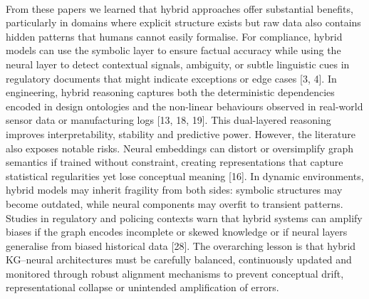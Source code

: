         \paragraph{} 
        From these papers we learned that hybrid approaches offer substantial benefits, particularly in domains where explicit structure exists but raw data also contains hidden patterns that humans cannot easily formalise. For compliance, hybrid models can use the symbolic layer to ensure factual accuracy while using the neural layer to detect contextual signals, ambiguity, or subtle linguistic cues in regulatory documents that might indicate exceptions or edge cases [3, 4]. In engineering, hybrid reasoning captures both the deterministic dependencies encoded in design ontologies and the non-linear behaviours observed in real-world sensor data or manufacturing logs [13, 18, 19]. This dual-layered reasoning improves interpretability, stability and predictive power. However, the literature also exposes notable risks. Neural embeddings can distort or oversimplify graph semantics if trained without constraint, creating representations that capture statistical regularities yet lose conceptual meaning [16]. In dynamic environments, hybrid models may inherit fragility from both sides: symbolic structures may become outdated, while neural components may overfit to transient patterns. Studies in regulatory and policing contexts warn that hybrid systems can amplify biases if the graph encodes incomplete or skewed knowledge or if neural layers generalise from biased historical data [28]. The overarching lesson is that hybrid KG–neural architectures must be carefully balanced, continuously updated and monitored through robust alignment mechanisms to prevent conceptual drift, representational collapse or unintended amplification of errors.

        \newpage

